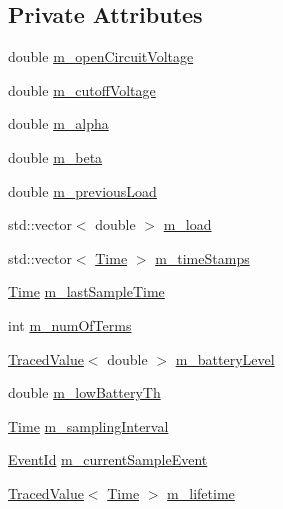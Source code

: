 \subsection*{Private Attributes}
\begin{DoxyCompactItemize}
\item 
double \hyperlink{classns3_1_1RvBatteryModel_a0dc610b9862b35f5cd83af39b319e4b7}{m\+\_\+open\+Circuit\+Voltage}
\item 
double \hyperlink{classns3_1_1RvBatteryModel_a367d164b01ccbe49179d7a7bccfb6a94}{m\+\_\+cutoff\+Voltage}
\item 
double \hyperlink{classns3_1_1RvBatteryModel_af1cad7267993108628a0a9d8ad622212}{m\+\_\+alpha}
\item 
double \hyperlink{classns3_1_1RvBatteryModel_afd9fb778ecbaf556b125e4a557baba86}{m\+\_\+beta}
\item 
double \hyperlink{classns3_1_1RvBatteryModel_a53cbe01e0b8ea5e51f4b248bba16170d}{m\+\_\+previous\+Load}
\item 
std\+::vector$<$ double $>$ \hyperlink{classns3_1_1RvBatteryModel_aa09c5b1b5789a09ef0c34a583f20ac86}{m\+\_\+load}
\item 
std\+::vector$<$ \hyperlink{classns3_1_1Time}{Time} $>$ \hyperlink{classns3_1_1RvBatteryModel_a5748296171832703aa812b6e7389e7da}{m\+\_\+time\+Stamps}
\item 
\hyperlink{classns3_1_1Time}{Time} \hyperlink{classns3_1_1RvBatteryModel_a4b917fecc461f1b2446e307fed5a374f}{m\+\_\+last\+Sample\+Time}
\item 
int \hyperlink{classns3_1_1RvBatteryModel_a57a22ebee1bbbfe679e43e711098a085}{m\+\_\+num\+Of\+Terms}
\item 
\hyperlink{classns3_1_1TracedValue}{Traced\+Value}$<$ double $>$ \hyperlink{classns3_1_1RvBatteryModel_af8c48353c513a2279115e52927b479a0}{m\+\_\+battery\+Level}
\item 
double \hyperlink{classns3_1_1RvBatteryModel_a01e8c3b6a4ff1b066d2fe0271c216007}{m\+\_\+low\+Battery\+Th}
\item 
\hyperlink{classns3_1_1Time}{Time} \hyperlink{classns3_1_1RvBatteryModel_aab7b0edf6e33a0dc26cc633af6b6ac2e}{m\+\_\+sampling\+Interval}
\item 
\hyperlink{classns3_1_1EventId}{Event\+Id} \hyperlink{classns3_1_1RvBatteryModel_a3eb7ced1023c82a8a4714d46e8a97342}{m\+\_\+current\+Sample\+Event}
\item 
\hyperlink{classns3_1_1TracedValue}{Traced\+Value}$<$ \hyperlink{classns3_1_1Time}{Time} $>$ \hyperlink{classns3_1_1RvBatteryModel_aab2f6462269e44fda1b9425a6cb8bdf6}{m\+\_\+lifetime}
\end{DoxyCompactItemize}
